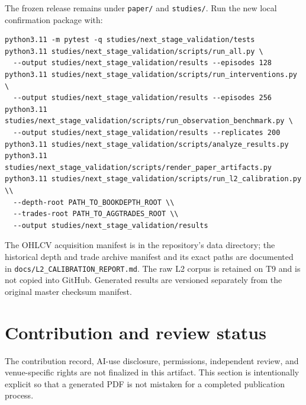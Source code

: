 \documentclass[10pt]{article}
\newcommand{\codelink}[1]{\texttt{#1}}
\begin{document}
The frozen release remains under \codelink{paper/} and \codelink{studies/}.
Run the new local confirmation package with:

\begin{verbatim}
python3.11 -m pytest -q studies/next_stage_validation/tests
python3.11 studies/next_stage_validation/scripts/run_all.py \
  --output studies/next_stage_validation/results --episodes 128
python3.11 studies/next_stage_validation/scripts/run_interventions.py \
  --output studies/next_stage_validation/results --episodes 256
python3.11 studies/next_stage_validation/scripts/run_observation_benchmark.py \
  --output studies/next_stage_validation/results --replicates 200
python3.11 studies/next_stage_validation/scripts/analyze_results.py
python3.11 studies/next_stage_validation/scripts/render_paper_artifacts.py
python3.11 studies/next_stage_validation/scripts/run_l2_calibration.py \\
  --depth-root PATH_TO_BOOKDEPTH_ROOT \\
  --trades-root PATH_TO_AGGTRADES_ROOT \\
  --output studies/next_stage_validation/results
\end{verbatim}

The OHLCV acquisition manifest is in the repository's data directory; the
historical depth and trade archive manifest and its exact paths are documented
in \codelink{docs/L2\_CALIBRATION\_REPORT.md}.
The raw L2 corpus is retained on T9 and is not copied into GitHub. Generated
results are versioned separately from the original master checksum manifest.

\section*{Contribution and review status}

The contribution record, AI-use disclosure, permissions, independent review,
and venue-specific rights are not finalized in this artifact. This section is
intentionally explicit so that a generated PDF is not mistaken for a completed
publication process.
\end{document}

